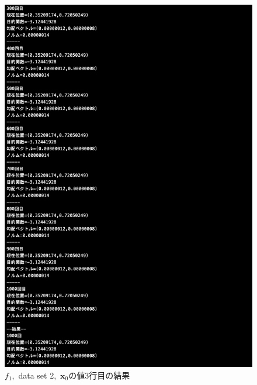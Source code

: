 \documentclass[12pt]{jarticle}
\begin{document}
\begin{figure}[h]
\begin{minipage}{0.5\hsize}
\begin{center}
            \includegraphics[scale=0.2]{kadai1_1s_out2_3_3.png}
        \end{center}
    \end{minipage}
    \caption{$f_1$,\ data set 2,\ $\boldsymbol{x}_0$の値3行目の結果}
\end{figure}
\end{document}
